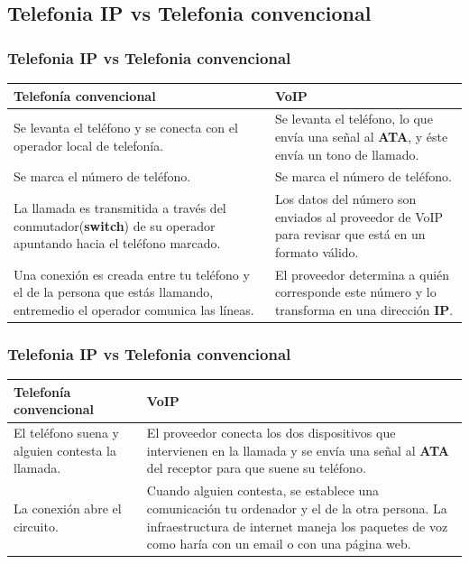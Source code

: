 \documentclass{beamer}
\begin{document}
	\subsection{Telefonia IP vs Telefonia convencional}
	\begin{frame}
	\frametitle{Telefonia IP vs Telefonia convencional}
		\begin{tabular}{|p{5.5cm}|p{5.5cm}|}
		\hline
		\textbf{Telefonía convencional} & \textbf{VoIP} \\
		\hline \hline
		Se levanta el teléfono y se conecta con el operador local de telefonía. & Se levanta el teléfono, lo que envía una señal al \textbf{ATA}, y éste envía un tono de llamado. \\
		\hline
		Se marca el número de teléfono. & Se marca el número de teléfono. \\
		\hline
		La llamada es transmitida a través del conmutador(\textbf{switch}) de su operador apuntando hacia el teléfono marcado. & Los datos del número son enviados al proveedor de VoIP para revisar que está en un formato válido. \\
		\hline
		Una conexión es creada entre tu teléfono y el de la persona que estás llamando, entremedio el operador comunica las líneas. & El proveedor determina a quién corresponde este número y lo transforma en una dirección \textbf{IP}. \\
		\hline
		\end{tabular}
	\end{frame}
	
	\begin{frame}
	\frametitle{Telefonia IP vs Telefonia convencional}
		\begin{tabular}{|p{5.5cm}|p{5.5cm}|}
					\hline
			\textbf{Telefonía convencional} & \textbf{VoIP} \\
			\hline \hline
			El teléfono suena y alguien contesta la llamada. & El proveedor conecta los dos dispositivos que intervienen en la llamada y se envía una señal al \textbf{ATA} del receptor para que suene su teléfono. \\
			\hline
			La conexión abre el circuito. & Cuando alguien contesta, se establece una comunicación tu ordenador y el de la otra persona. La infraestructura de internet maneja los paquetes de voz como haría con un email o con una página web. \\
			\hline
		\end{tabular}
	\end{frame}
	
\end{document}
